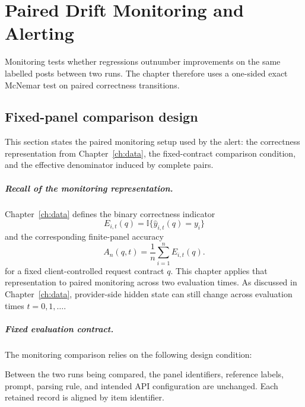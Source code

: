 \chapter{Paired Drift Monitoring and Alerting}
\label{ch:drift}

\noindent Monitoring tests whether regressions outnumber improvements on the same labelled posts between two runs. The chapter therefore uses a one-sided exact McNemar test on paired correctness transitions.

\section{Fixed-panel comparison design}
\label{sec:formalisation-temporal}

This section states the paired monitoring setup used by the alert: the correctness representation from Chapter~\ref{ch:data}, the fixed-contract comparison condition, and the effective denominator induced by complete pairs.

\paragraph{Recall of the monitoring representation.}

Chapter~\ref{ch:data} defines the binary correctness indicator
\begin{equation}
    E_{i,t}(q)=\mathbb{I}\{\hat y_{i,t}(q)=y_i\}
    \label{eq:correctness-indicator}
\end{equation}
and the corresponding finite-panel accuracy
\begin{equation}
    A_n(q,t)
    =
    \frac{1}{n}\sum_{i=1}^{n}E_{i,t}(q).
    \label{eq:chapter3-panel-accuracy}
\end{equation}
for a fixed client-controlled request contract \(q\). This chapter applies that representation to paired monitoring across two evaluation times. As discussed in Chapter~\ref{ch:data}, provider-side hidden state can still change across evaluation times \(t=0,1,\ldots\).

\paragraph{Fixed evaluation contract.}

The monitoring comparison relies on the following design condition:

\begin{assumption}
Between the two runs being compared, the panel identifiers, reference labels, prompt, parsing rule, and intended API configuration are unchanged. Each retained record is aligned by item identifier.
\label{ass:fixed-evaluation-contract}
\end{assumption}

